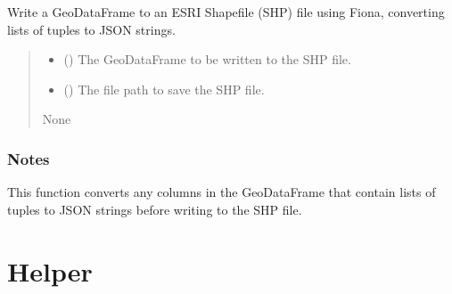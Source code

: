 \documentclass[letterpaper,10pt,english]{sphinxmanual}
\begin{document}

\begin{fulllineitems}
\label{\detokenize{pysewer:pysewer.export.write_gdf_to_shp}}
\pysigstartsignatures
{}
\pysigstopsignatures
\sphinxAtStartPar
Write a GeoDataFrame to an ESRI Shapefile (SHP) file using Fiona, converting lists of tuples to JSON strings.
\begin{quote}\begin{description}
\begin{itemize}
\item {} 
\sphinxAtStartPar
{} () \textendash{} The GeoDataFrame to be written to the SHP file.

\item {} 
\sphinxAtStartPar
{} () \textendash{} The file path to save the SHP file.

\end{itemize}

\sphinxAtStartPar
None

\end{description}\end{quote}
\subsubsection*{Notes}

\sphinxAtStartPar
This function converts any columns in the GeoDataFrame that contain lists of tuples to JSON strings before writing to the SHP file.

\end{fulllineitems}



\section{Helper}
\label{\detokenize{pysewer:module-pysewer.helper}}\label{\detokenize{pysewer:helper}}
\end{document}
